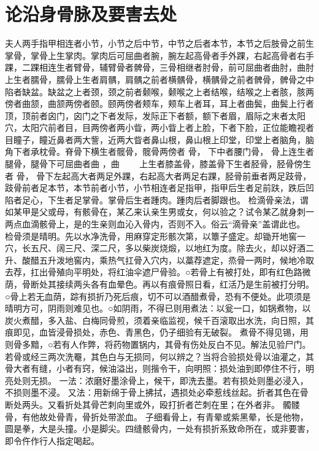 \documentclass[12pt,UTF8]{ctexbook}
\begin{document}
\chapter{论沿身骨脉及要害去处}

夫人两手指甲相连者小节，小节之后中节，中节之后者本节，本节之后肢骨之前生掌骨，掌骨上生掌肉。掌肉后可屈曲者腕，腕左起高骨者手外踝，右起高骨者右手踝，二踝相连生者臂骨，辅臂骨者髀骨，三骨相继者肘骨，前可屈曲者曲肘，曲肘上生者臑骨，臑骨上生者肩髃，肩髃之前者横髃骨，横髃骨之前者髀骨，髀骨之中陷者缺盆。缺盆之上者颈，颈之前者颡喉，颡喉之上者结喉，结喉之上者胲，胲两傍者曲颔，曲颔两傍者颐。颐两傍者颊车，颊车上者耳，耳上者曲鬓，曲鬓上行者顶，顶前者囟门，囟门之下者发际，发际正下者额，额下者眉，眉际之末者太阳穴，太阳穴前者目，目两傍者两小眥，两小眥上者上脸，下者下脸，正位能瞻视者目瞳子，瞳近鼻者两大訾，近两大眥者鼻山根，鼻山根上印堂，印堂上者脑角，脑角下者承枕骨。脊骨下横生者髋骨，髋骨两傍者 骨， 下中者腰门骨， 骨上连生者腿骨，腿骨下可屈曲者曲 ，曲　　 上生者膝盖骨，膝盖骨下生者胫骨，胫骨傍生者 骨， 骨下左起高大者两足外踝，右起高大者两足右踝，胫骨前垂者两足跂骨，跂骨前者足本节，本节前者小节，小节相连者足指甲，指甲后生者足前趺，跌后凹陷者足心，下生者足掌骨。掌骨后生者踵肉。踵肉后者脚跟也。
检滴骨亲法，谓如某甲是父或母，有骸骨在，某乙来认亲生男或女，何以验之？试令某乙就身刺一两点血滴骸骨上，是的生亲则血沁入骨内，否则不入。俗云“滴骨亲”盖谓此也。
检骨须是晴明。先以水净洗骨，用麻穿定形骸次第，以簟子盛定。却锄开地窖一穴，长五尺、阔三尺、深二尺，多以柴炭烧煅，以地红为度。除去火，却以好酒二升、酸醋五升泼地窖内，乘热气扛骨入穴内，以藁荐遮定，烝骨一两时，候地冷取去荐，扛出骨殖向平明处，将红油伞遮尸骨验。○若骨上有被打处，即有红色路微荫，骨断处其接续两头各有血晕色。再以有痕骨照日看，红活乃是生前被打分明。○骨上若无血荫，踪有损折乃死后痕，切不可以酒醋煮骨，恐有不便处。此项须是晴明方可，阴雨则难见也。○如阴雨，不得已则用煮法：以瓮一口，如锅煮物，以炭火煮醋，多入盐、白梅同骨煎，须着亲临监视，候千百滚取出水洗，向日照，其痕即见，血皆浸骨损处，赤色、青黑色，仍子细验有无破裂。
煮骨不得见锡，用则骨多黯，○若有人作弊，将药物置锅内，其骨有伤处反白不见。解法见验尸门。
若骨或经三两次洗罨，其色白与无损同，何以辨之？当将合验损处骨以油灌之，其骨大者有缝，小者有窍，候油溢出，则揩令干，向明照：损处油到即停住不行，明亮处则无损。
一法：浓磨好墨涂骨上，候干，即洗去墨。若有损处则墨必浸入，不损则墨不浸。
又法：用新绵于骨上拂拭，遇损处必牵惹线丝起。折者其色在骨断处两头。又看折处其骨芒刺向里或外，殴打折者芒刺在里；在外者非。
髑髅骨，有他故处骨青，骨折处带淤血。
子细看骨上，有青晕或紫黑晕，长是他物，圆是拳，大是头撞。小是脚尖。四缝骸骨内，一处有损折系致命所在，或非要害，即令仵作行人指定喝起。
\end{document}

